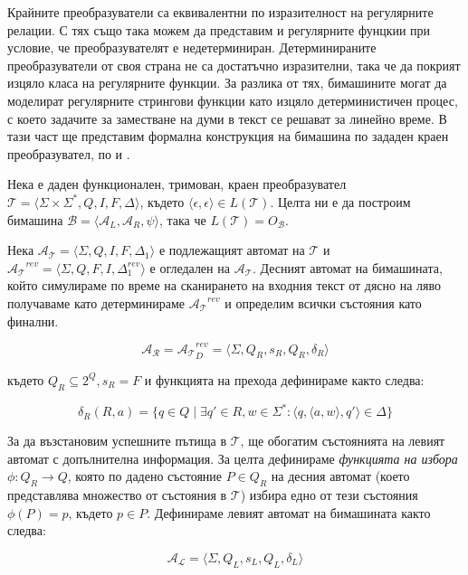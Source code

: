 \documentclass[12pt, oneside]{article}
\theoremstyle{definition}
\begin{document}
Крайните преобразуватели са еквивалентни по изразителност на регулярните релации. С тях също така можем да представим и регулярните фунцкии при условие, че преобразувателят е недетерминиран. Детерминираните преобразуватели от своя страна не са достатъчно изразителни, така че да покрият изцяло класа на регулярните функции. За разлика от тях, бимашините могат да моделират регулярните стрингови функции \cite{Schutzenberger:61} като изцяло детерминистичен процес, с което задачите за заместване на думи в текст се решават за линейно време. В тази част ще представим формална конструкция на бимашина по зададен краен преобразувател, по \cite{GerdjikovEtAl:2017} и \cite{Mihov:2018-2}. 

Нека е даден функционален, тримован, краен преобразувател \( \mathcal{T} = \langle \Sigma \times \Sigma^*, Q, I, F, \Delta \rangle \), където \( \langle \epsilon, \epsilon \rangle \in L(\mathcal{T}) \). Целта ни е да построим бимашина \( \mathcal{B} = \langle \mathcal{A}_L, \mathcal{A}_R, \psi \rangle \), така че \( L(\mathcal{T}) = O_\mathcal{B} \).

Нека \( \mathcal{A_T} = \langle \Sigma, Q, I, F, \Delta_1 \rangle \) е подлежащият автомат на \( \mathcal{T} \) и \( \mathcal{A_T}^{rev} = \langle \Sigma, Q, F, I, \Delta_1^{rev} \rangle \) е огледален на \( \mathcal{A_T} \). Десният автомат на бимашината, който симулираме по време на сканирането на входния текст от дясно на ляво получаваме като детерминираме \( \mathcal{A_T}^{rev} \) и определим всички състояния като финални.

\[ \mathcal{A_R} = \mathcal{A_T}^{rev}_D = \langle \Sigma, Q_R, s_R, Q_R, \delta_R \rangle \]

където \( Q_R \subseteq 2^Q, s_R = F \) и функцията на прехода дефинираме както следва:

\[ \delta_R(R,a) = \{ q \in Q \mid \exists q' \in R, w \in \Sigma^* : \langle q, \langle a, w \rangle, q' \rangle \in \Delta \} \]

За да възстановим успешните пътища в \(\mathcal{T}\), ще обогатим състоянията на левият автомат с допълнителна информация. За целта дефинираме \emph{функцията на избора} \( \phi: Q_R \to Q \), която по дадено състояние \(P \in Q_R \) на десния автомат (което представлява множество от състояния в \(\mathcal{T}\)) избира едно от тези състояния \( \phi(P) = p \text{, където } p \in P \). Дефинираме левият автомат на бимашината както следва:

\[ \mathcal{A_L} = \langle \Sigma, Q_L, s_L, Q_L, \delta_L \rangle \]
\end{document}
